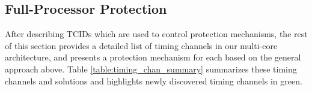 %

\subsection{Full-Processor Protection}


After describing TCIDs which are used to control protection mechanisms,
the rest of this section provides a detailed list of timing channels in our  
multi-core architecture, and presents a protection mechanism for each 
based on the general approach above.
Table \ref{table:timing_chan_summary} summarizes these timing channels and
solutions and highlights newly discovered timing channels in green.

